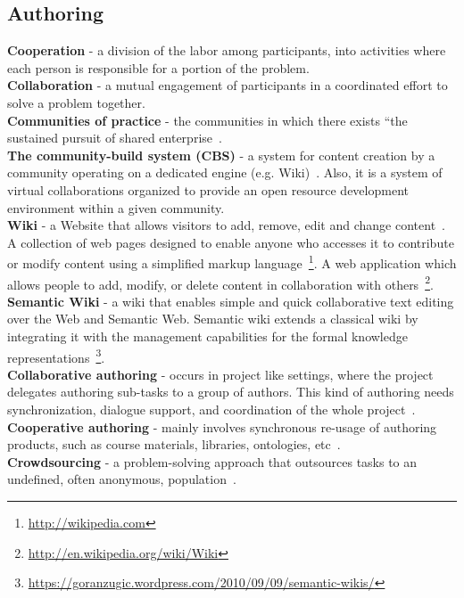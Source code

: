 \documentclass[ngerman,UKenglish,table]{scrbook}
\begin{document}
\subsection{Authoring}
\textbf{Cooperation} - a division of the labor among participants, into activities where each person is responsible for a portion of the problem.~\cite{roschelle1995construction}\\
\textbf{Collaboration} - a mutual engagement of participants in a coordinated effort to solve a problem together.~\cite{Romero-Moreno2007}\\ 
\textbf{Communities of practice} - the communities in which there exists “the sustained pursuit of shared enterprise~\cite{wenger1998communities}.\\
\textbf{The community-build system (CBS)} - a system for content creation by a community operating on a dedicated engine (e.g. Wiki)~\cite{Ro.zewski2011}. Also, it is a system of virtual collaborations organized to provide an open resource development environment within a given community. \\
\textbf{Wiki} - a Website that allows visitors to add, remove, edit and change content~\cite{Dahlan2010}. A collection of web pages designed to enable anyone who accesses it to contribute or modify content using a simplified markup language~\footnote{\url{http://wikipedia.com}}.
A web application which allows people to add, modify, or delete content in collaboration with others~\footnote{\url{http://en.wikipedia.org/wiki/Wiki}}.\\ 
\textbf{Semantic Wiki} - a wiki that enables simple and quick collaborative text editing over the Web and Semantic Web. Semantic wiki extends a classical wiki by integrating it with the management capabilities for the formal knowledge representations~\footnote{\url{https://goranzugic.wordpress.com/2010/09/09/semantic-wikis/}}.\\
\textbf{Collaborative authoring} - occurs in project like settings, where the project delegates authoring sub-tasks to a group of authors.
This kind of authoring needs synchronization, dialogue support, and coordination of the whole project~\cite{dicheva2002collaborative}.\\
\textbf{Cooperative authoring} - mainly involves synchronous re-usage of authoring products, such as course materials, libraries, ontologies, etc~\cite{dicheva2002collaborative}.\\ 
\textbf{Crowdsourcing} - a problem-solving approach that outsources tasks to an undefined, often anonymous, population~\cite{howe2006rise}. \\
\end{document}
